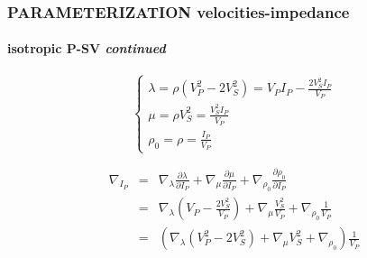 \documentclass[9pt]{beamer}
\newcommand{\partderi}[2]{\frac{\partial#1}{\partial#2}}
\begin{document}
\begin{frame}
\begin{minipage}{\linewidth}
  \end{minipage} %
%     

\end{frame}

\begin{frame}\frametitle{PARAMETERIZATION velocities-impedance}
\framesubtitle{isotropic P-SV \textit{continued}}
  \begin{minipage}{\linewidth}
    \[\left\{ \begin{array}{l}
      \lambda = \rho (V_P^2-2V_S^2) = V_PI_P - \frac{2V_S^2I_P}{V_P} \\
      \mu    = \rho V_S^2 = \frac{V_S^2I_P}{V_P} \\
      \rho_0 = \rho = \frac{I_P}{V_P}
    \end{array} \right.\]
    
    \begin{eqnarray}
      \nabla_{I_P} &=& \nabla_\lambda \partderi{\lambda}{I_P} + \nabla_\mu \partderi{\mu}{I_P} + \nabla_{\rho_0} \partderi{\rho_0}{I_P} \nonumber\\
		   &=& \nabla_\lambda \left(V_P-\frac{2V_S^2}{V_P}\right) + \nabla_\mu \frac{V_S^2}{V_P} + \nabla_{\rho_0} \frac{1}{V_P} \nonumber\\
		   &=& \left( \nabla_\lambda (V_P^2-2V_S^2) + \nabla_\mu V_S^2 + \nabla_{\rho_0} \right) \frac{1}{V_P} \nonumber
    \end{eqnarray}
  \end{minipage}
\end{frame}
\end{document}
